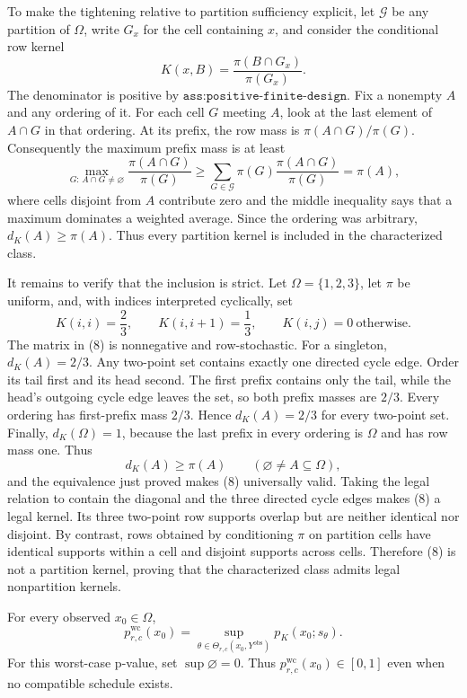 To make the tightening relative to partition sufficiency explicit, let
\(\mathcal G\) be any partition of \(\Omega\), write \(G_x\) for the cell
containing \(x\), and consider the conditional row kernel
\[
K(x,B)=\frac{\pi(B\cap G_x)}{\pi(G_x)}.
\tag{6}
\]
The denominator is positive by \(\texttt{ass:positive-finite-design}\).  Fix a
nonempty \(A\) and any ordering of it.  For each cell \(G\) meeting \(A\), look
at the last element of \(A\cap G\) in that ordering.  At its prefix, the row
mass is \(\pi(A\cap G)/\pi(G)\).  Consequently the maximum prefix mass is at
least
\[
\max_{G:\,A\cap G\neq\varnothing}
\frac{\pi(A\cap G)}{\pi(G)}
\geq
\sum_{G\in\mathcal G}\pi(G)
\frac{\pi(A\cap G)}{\pi(G)}
=\pi(A),
\tag{7}
\]
where cells disjoint from \(A\) contribute zero and the middle inequality says
that a maximum dominates a weighted average.  Since the ordering was arbitrary,
\(d_K(A)\geq\pi(A)\).  Thus every partition kernel is included in the
characterized class.

It remains to verify that the inclusion is strict.  Let
\(\Omega=\{1,2,3\}\), let \(\pi\) be uniform, and, with indices interpreted
cyclically, set
\[
K(i,i)=\frac23,
\qquad
K(i,i+1)=\frac13,
\qquad
K(i,j)=0\ \text{otherwise}.
\tag{8}
\]
The matrix in (8) is nonnegative and row-stochastic.  For a singleton,
\(d_K(A)=2/3\).  Any two-point set contains exactly one directed cycle edge.
Order its tail first and its head second.  The first prefix contains only the
tail, while the head's outgoing cycle edge leaves the set, so both prefix
masses are \(2/3\).  Every ordering has first-prefix mass \(2/3\).  Hence
\(d_K(A)=2/3\) for every two-point set.  Finally,
\(d_K(\Omega)=1\), because the last prefix in every ordering is \(\Omega\) and
has row mass one.  Thus
\[
d_K(A)\geq\pi(A)
\qquad(\varnothing\neq A\subseteq\Omega),
\]
and the equivalence just proved makes (8) universally valid.  Taking the legal
relation to contain the diagonal and the three directed cycle edges makes (8)
a legal kernel.  Its three two-point row supports overlap but are neither
identical nor disjoint.  By contrast, rows obtained by conditioning \(\pi\) on
partition cells have identical supports within a cell and disjoint supports
across cells.  Therefore (8) is not a partition kernel, proving that the
characterized class admits legal nonpartition kernels.

For every observed \(x_0\in\Omega\),
\[
p^{\mathrm{wc}}_{r,c}(x_0)
=\sup_{\theta\in\Theta_{r,c}(x_0,Y^{\mathrm{obs}})}
p_K(x_0;s_{\theta}).
\]
For this worst-case p-value, set \(\sup\varnothing=0\).  Thus
\(p^{\mathrm{wc}}_{r,c}(x_0)\in[0,1]\) even when no compatible schedule
exists.

